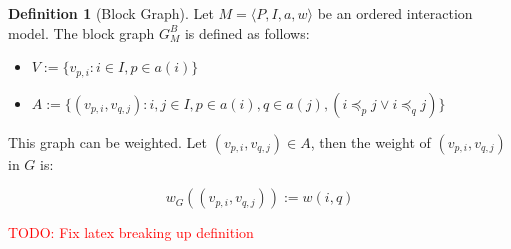 \documentclass[a4paper,11pt]{book}
\newcommand\musthave[1]{\textcolor{red}{TODO: #1}}
\theoremstyle{definition}
\newtheorem{definition}{Definition}
\begin{document}
\begin{definition}[Block Graph]
    Let $M = \langle P, I, a, w \rangle$ be an ordered interaction model. The block graph $G^B_{M}$ is defined as follows:

    \begin{itemize}
        \item $V := \{ v_{p, i} : i \in I, p \in a(i) \}$\\
        \item $A := \{ (v_{p,i}, v_{q,j}) : i, j \in I, p \in a(i), q \in a(j), (i \preceq_p j \vee i \preceq_q j) \}$\\
    \end{itemize}

    This graph can be weighted. Let $(v_{p,i}, v_{q, j}) \in A$, then the weight of $(v_{p,i}, v_{q, j})$ in
    $G$ is:

    \begin{equation*}
        w_G((v_{p,i}, v_{q, j})) := w(i, q)
    \end{equation*}
\end{definition}

\musthave{Fix latex breaking up definition}
\end{document}
